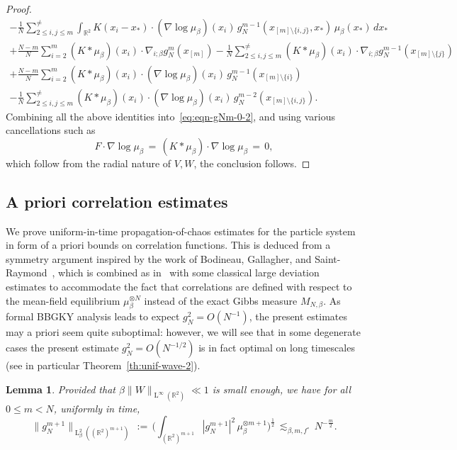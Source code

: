 \documentclass[a4paper,11pt,reqno,noindent]{amsart}
\theoremstyle{plain}
\newtheorem{lem}{Lemma}[section]
\numberwithin{equation}{section}
\newcommand{\R}{\mathbb R}
\newcommand{\3}{|\!|\!|}
\newcommand{\Ld}{\operatorname{L}}
\begin{document}
\begin{proof}
\begin{multline*}
-\tfrac1N\sum_{2\le i,j\le m}^{\ne}\int_{\R^2} K(x_i-x_*)\cdot (\nabla\log\mu_\beta)(x_i)\,g_N^{m-1}(x_{[m]\setminus\{i,j\}},x_*)\,\mu_\beta(x_*)\,dx_*\\
+\tfrac{N-m}N\sum_{i=2}^m(K\ast\mu_\beta)(x_i)\cdot \nabla_{i;\beta}g_N^{m}(x_{[m]})
-\tfrac{1}N\sum_{2\le i,j\le m}^{\ne}(K\ast\mu_\beta)(x_i)\cdot \nabla_{i;\beta}g_N^{m-1}(x_{[m]\setminus\{j\}})\\
+\tfrac{N-m}N\sum_{i=2}^m(K\ast\mu_\beta)(x_i)\cdot (\nabla\log\mu_\beta)(x_i)\,g_N^{m-1}(x_{[m]\setminus\{i\}})\\
-\tfrac{1}N\sum_{2\le i,j\le m}^{\ne}(K\ast\mu_\beta)(x_i)\cdot (\nabla\log\mu_\beta)(x_i)\,g_N^{m-2}(x_{[m]\setminus\{i,j\}}).
\end{multline*}
Combining all the above identities into~\eqref{eq:eqn-gNm-0-2}, and using various cancellations such as
\[F\cdot\nabla\log\mu_\beta\,=\,(K\ast\mu_\beta)\cdot\nabla\log\mu_\beta\,=\,0,\]
which follow from the radial nature of $V,W$,
the conclusion follows.
\end{proof}
\endgroup

\subsection{A priori correlation estimates}
We prove uniform-in-time propagation-of-chaos estimates for the particle system in form of a priori bounds on correlation functions.
This is deduced from a symmetry argument inspired by the work of Bodineau, Gallagher, and Saint-Raymond~\cite{BGSR-16}, which is combined as in~\cite{DSR-21} with some classical large deviation estimates to accommodate the fact that correlations are defined with respect to the mean-field equilibrium $\mu_\beta^{\otimes N}$ instead of the exact Gibbs measure $M_{N,\beta}$.
As formal BBGKY analysis leads to expect $g_N^2=O(N^{-1})$, the present estimates may a priori seem quite suboptimal: however, we will see that in some degenerate cases the present estimate $g_N^2=O(N^{-1/2})$ is in fact optimal on long timescales (see in particular Theorem~\ref{th:unif-wave-2}).

\begin{lem}\label{lem:est-cum-2}
Provided that $\beta\|W\|_{\Ld^\infty(\R^2)}\ll1$ is small enough, we have for all~$0\le m<N$, uniformly in time,
\[\|g_N^{m+1}\|_{\Ld^2_\beta((\R^2)^{m+1})}\,:=\,\Big(\int_{(\R^2)^{m+1}}|g_N^{m+1}|^2\,\mu_\beta^{\otimes m+1}\Big)^\frac12\,\lesssim_{\beta,m,f^\circ}\,N^{-\frac m2}.\]
\end{lem}
\end{document}
